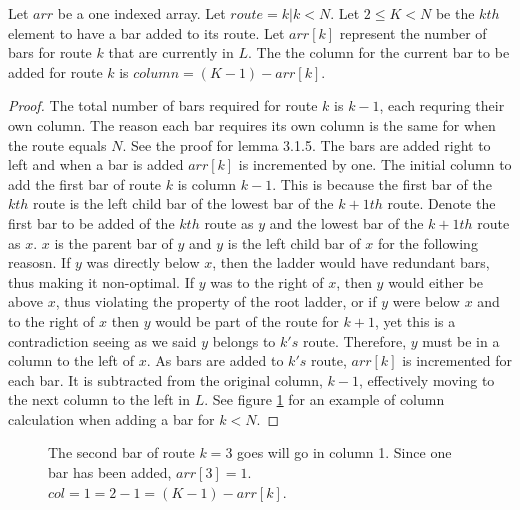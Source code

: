 \begin{lemma}
  Let $arr$ be a one indexed array. Let $route=k |k < N$. Let $2 \leq K < N$ be the $kth$ element to have a bar added to its route. 
  Let $arr[k]$ represent the number of bars for route $k$ that are currently in $L$. 
  The the column for the current bar to be added for route $k$ is $column=(K-1)-arr[k]$.
\end{lemma}
\begin{proof}
  The total number of bars required for route $k$ is $k-1$, each requring their own column. The reason each 
  bar requires its own column is the same for when the route equals $N$. See the proof for lemma 3.1.5. The 
  bars are added right to left and when a bar is added $arr[k]$ is incremented by one. The initial column to add the first bar 
  of route $k$ is column $k-1$. This is because the first bar of the $kth$ route is the left child bar of the 
  lowest bar of the $k+1th$ route. Denote the first bar to be added of the $kth$ route as $y$ and the 
  lowest bar of the $k+1th$ route as $x$. $x$ is the parent bar of $y$ and $y$ is the left child bar of 
  $x$ for the following reasosn. If $y$ was directly below $x$, then the ladder would have redundant bars, thus making it 
  non-optimal. If $y$ was to the right of $x$, then $y$ would either be above $x$, thus violating the property of the root ladder, 
  or if $y$ were below $x$ and to the right of $x$ then $y$ would be part of the route for $k+1$, yet this is a contradiction 
  seeing as we said $y$ belongs to $k's$ route. Therefore, $y$ must be in a column to the left of $x$. As bars are added 
  to $k's$ route, $arr[k]$ is incremented for each bar. It is subtracted from the original column, $k-1$, effectively moving 
  to the next column to the left in $L$. See figure \ref{Fig:SJTcase6} for an example of column calculation when adding a bar for $k<N$.
\end{proof}
\begin{figure}[!htp]
  \begin{center}
    
\end{center} 
\caption{The second bar of route $k=3$ goes will go in column 1. Since one bar has been added, $arr[3]=1$. $col=1=2-1=(K-1)-arr[k]$.}

\label{Fig:SJTcase6}
\end{figure}

